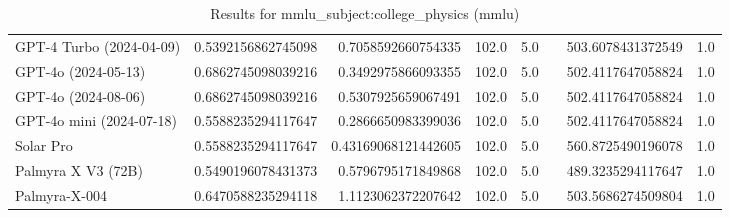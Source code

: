 \begin{table}[htp]
{\begin{tabular}{lrrrrrrr}
GPT-4 Turbo (2024-04-09) & 0.5392156862745098 & 0.7058592660754335 & 102.0 & 5.0 &  & 503.6078431372549 & 1.0 \\
GPT-4o (2024-05-13) & 0.6862745098039216 & 0.3492975866093355 & 102.0 & 5.0 &  & 502.4117647058824 & 1.0 \\
GPT-4o (2024-08-06) & 0.6862745098039216 & 0.5307925659067491 & 102.0 & 5.0 &  & 502.4117647058824 & 1.0 \\
GPT-4o mini (2024-07-18) & 0.5588235294117647 & 0.2866650983399036 & 102.0 & 5.0 &  & 502.4117647058824 & 1.0 \\
Solar Pro & 0.5588235294117647 & 0.43169068121442605 & 102.0 & 5.0 &  & 560.8725490196078 & 1.0 \\
Palmyra X V3 (72B) & 0.5490196078431373 & 0.5796795171849868 & 102.0 & 5.0 &  & 489.3235294117647 & 1.0 \\
Palmyra-X-004 & 0.6470588235294118 & 1.1123062372207642 & 102.0 & 5.0 &  & 503.5686274509804 & 1.0 \\
\bottomrule
\end{tabular}}
\caption{Results for mmlu_subject:college_physics (mmlu)}
\label{fig:mmlu_subject:college_physics (mmlu)}
\end{table}